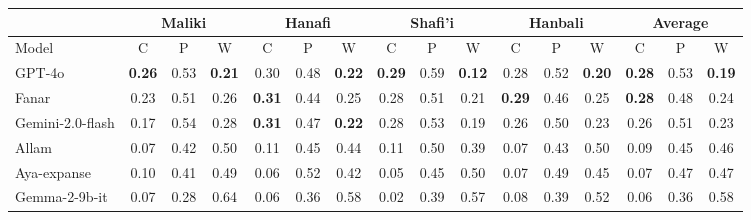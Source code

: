 \documentclass[letterpaper]{article}
\begin{document}
\begin{table}[h]
{\begin{tabular}{l|ccc|ccc|ccc|ccc|ccc}
	&	\multicolumn{3}{c|}{\textbf{Maliki}}					&	\multicolumn{3}{c|}{\textbf{Hanafi}}					&	\multicolumn{3}{c|}{\textbf{Shafi'i}}					&	\multicolumn{3}{c|}{\textbf{Hanbali}}					&	\multicolumn{3}{c}{\textbf{Average}}					\\ \hline
Model	&	C	&	P	&	W	&	C	&	P	&	W	&	C	&	P	&	W	&	C	&	P	&	W	&	C	&	P	&	W	\\ \hline
GPT-4o           	&	\textbf{0.26}	&	0.53	&	\textbf{0.21}	&	0.30	&	0.48	&	\textbf{0.22}	&	\textbf{0.29}	&	0.59	&	\textbf{0.12}	&	0.28	&	0.52	&	\textbf{0.20}	&	\textbf{0.28}	&	0.53	&	\textbf{0.19}	\\
Fanar            	&	0.23	&	0.51	&	0.26	&	\textbf{0.31}	&	0.44	&	0.25	&	0.28	&	0.51	&	0.21	&	\textbf{0.29}	&	0.46	&	0.25	&	\textbf{0.28}	&	0.48	&	0.24	\\
Gemini-2.0-flash 	&	0.17	&	0.54	&	0.28	&	\textbf{0.31}	&	0.47	&	\textbf{0.22}	&	0.28	&	0.53	&	0.19	&	0.26	&	0.50	&	0.23	&	0.26	&	0.51	&	0.23	\\
Allam   &	0.07	&	0.42	&	0.50	&	0.11	&	0.45	&	0.44	&	0.11	&	0.50	&	0.39	&	0.07	&	0.43	&	0.50	&	0.09	&	0.45	&	0.46	\\
Aya-expanse      	&	0.10	&	0.41	&	0.49	&	0.06	&	0.52	&	0.42	&	0.05	&	0.45	&	0.50	&	0.07	&	0.49	&	0.45	&	0.07	&	0.47	&	0.47	\\
Gemma-2-9b-it    	&	0.07	&	0.28	&	0.64	&	0.06	&	0.36	&	0.58	&	0.02	&	0.39	&	0.57	&	0.08	&	0.39	&	0.52	&	0.06	&	0.36	&	0.58	\\



\bottomrule
\end{tabular}
}
\end{table}
\end{document}
